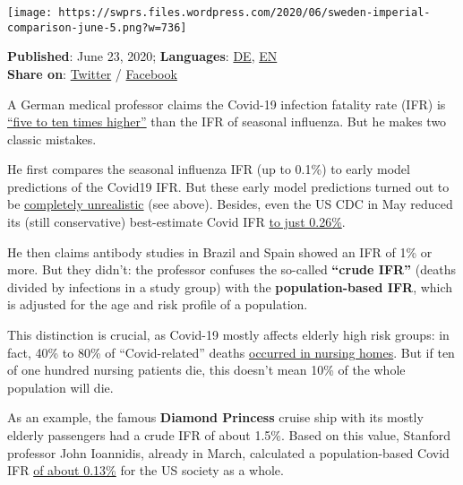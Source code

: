 \texttt{[image: https://swprs.files.wordpress.com/2020/06/sweden-imperial-comparison-june-5.png?w=736]}

\textbf{Published}: June 23, 2020; \textbf{Languages}:
\href{https://swprs.org/covid-19-letalitat-wie-man-es-nicht-macht/}{DE},
\href{https://swprs.org/covid19-lethality-how-not-to-do-it/}{EN}\\
\textbf{Share on}:
\href{https://twitter.com/intent/tweet?url=https://swprs.org/covid19-lethality-how-not-to-do-it/}{Twitter}
/
\href{https://www.facebook.com/share.php?u=https://swprs.org/covid19-lethality-how-not-to-do-it/}{Facebook}

A German medical professor claims the Covid-19 infection fatality rate
(IFR) is
\href{https://www.heise.de/tp/features/Wie-gefaehrlich-ist-Covid-19-im-Vergleich-zur-saisonalen-Grippe-4790313.html}{``five
to ten times higher''} than the IFR of seasonal influenza. But he makes
two classic mistakes.

He first compares the seasonal influenza IFR (up to 0.1\%) to early
model predictions of the Covid19 IFR. But these early model predictions
turned out to be
\href{https://swprs.org/studies-on-covid-19-lethality/}{completely
unrealistic} (see above). Besides, even the US CDC in May reduced its
(still conservative) best-estimate Covid IFR
\href{https://www.cdc.gov/coronavirus/2019-ncov/hcp/planning-scenarios.html}{to
just 0.26\%}.

He then claims antibody studies in Brazil and Spain showed an IFR of 1\%
or more. But they didn't: the professor confuses the so-called
\textbf{``crude IFR''} (deaths divided by infections in a study group)
with the \textbf{population-based IFR}, which is adjusted for the age
and risk profile of a population.

This distinction is crucial, as Covid-19 mostly affects elderly high
risk groups: in fact, 40\% to 80\% of ``Covid-related'' deaths
\href{https://swprs.org/studies-on-covid-19-lethality/\#care-homes}{occurred
in nursing homes}. But if ten of one hundred nursing patients die, this
doesn't mean 10\% of the whole population will die.

As an example, the famous \textbf{Diamond Princess} cruise ship with its
mostly elderly passengers had a crude IFR of about 1.5\%. Based on this
value, Stanford professor John Ioannidis, already in March, calculated a
population-based Covid IFR
\href{https://www.statnews.com/2020/03/17/a-fiasco-in-the-making-as-the-coronavirus-pandemic-takes-hold-we-are-making-decisions-without-reliable-data/}{of
about 0.13\%} for the US society as a whole.

